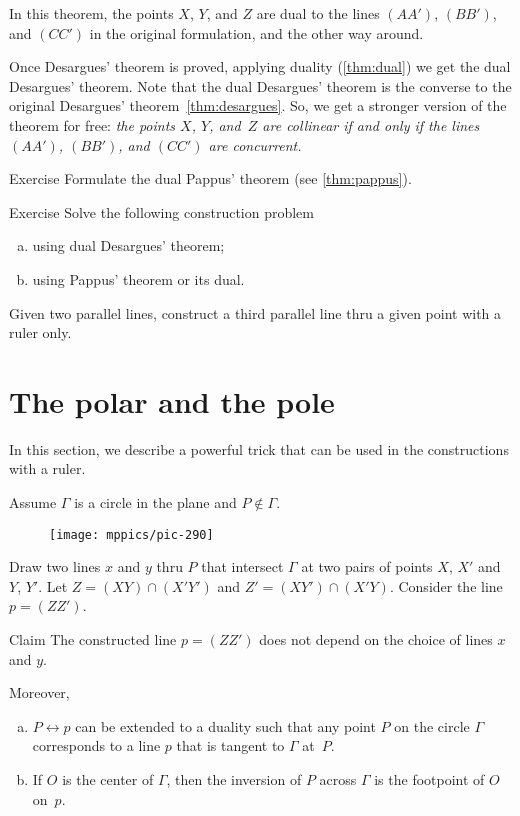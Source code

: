 In this theorem, the points $X$, $Y$, and $Z$ 
are dual to the lines $(AA')$, $(BB')$, and $(CC')$ in the original formulation, and the other way around.

Once Desargues' theorem is proved, applying duality (\ref{thm:dual})
we get the dual Desargues' theorem.
Note that the dual Desargues' theorem is the converse to the original Desargues' theorem~\ref{thm:desargues}.
So, we get a stronger version of the theorem for free: \textit{the points $X$, $Y$, and~$Z$ are collinear {}\emph{if and only if} the lines  $(AA')$, $(BB')$, and $(CC')$ are concurrent.}

\begin{thm}{Exercise}\label{ex:dual-pappus}
Formulate the dual Pappus' theorem (see \ref{thm:pappus}).
\end{thm}

\begin{thm}{Exercise}\label{ex:dual-desargues-construction} 
Solve the following construction problem
\begin{enumerate}[(a)]
\item\label{ex:dual-desargues-construction:desargues} using dual Desargues' theorem;
\item\label{ex:dual-desargues-construction:pappus} using Pappus' theorem or its dual.
\end{enumerate}
Given two parallel lines, construct a third parallel line thru a given point with a ruler only.
\end{thm}

\section{The polar and the pole}

In this section, we describe a powerful trick that can be used in the constructions with a ruler.

Assume $\Gamma$ is a circle in the plane and $P\notin \Gamma$.
\begin{figure}[!ht]
\centering
\texttt{[image: mppics/pic-290]}
\end{figure}
Draw two lines $x$ and $y$ thru $P$ that intersect $\Gamma$ at two pairs of points $X$, $X'$ and $Y$, $Y'$.
Let $Z=(XY)\cap(X'Y')$ and $Z'=(XY')\cap(X'Y)$.
Consider the line $p=(ZZ')$.

\begin{thm}{Claim}\label{clm:polar}
The constructed line $p=(ZZ')$ does not depend on the choice of lines $x$ and $y$.

Moreover, 

\begin{enumerate}[(a)]
\item $P\leftrightarrow p$ can be extended to a duality such that any point $P$ on the circle $\Gamma$ corresponds to a line $p$ that is tangent to $\Gamma$ at~$P$.
\item If $O$ is the center of $\Gamma$, then the inversion of $P$ across $\Gamma$ is the footpoint of $O$ on~$p$.
\end{enumerate}
 
\end{thm}

